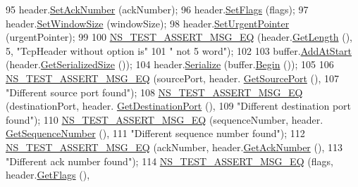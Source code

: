 \begin{DoxyCode}
95       header.\hyperlink{classns3_1_1TcpHeader_ad594a427a382dc395261a94749e1878c}{SetAckNumber} (ackNumber);
96       header.\hyperlink{classns3_1_1TcpHeader_a6574356013e9c62b4543486f640f6be6}{SetFlags} (flags);
97       header.\hyperlink{classns3_1_1TcpHeader_a659d7fc71c808249fe76fd5b667baf34}{SetWindowSize} (windowSize);
98       header.\hyperlink{classns3_1_1TcpHeader_a082b4d492dd7fb0b788a4c959f9065cc}{SetUrgentPointer} (urgentPointer);
99 
100       \hyperlink{group__testing_ga2a9d78cffb3db8e867c35fff0b698cf5}{NS\_TEST\_ASSERT\_MSG\_EQ} (header.\hyperlink{classns3_1_1TcpHeader_a957928d2dd1108dc1ef8c38daecdcf62}{GetLength} (), 5, \textcolor{stringliteral}{"TcpHeader without
       option is"}
101                              \textcolor{stringliteral}{" not 5 word"});
102 
103       buffer.\hyperlink{classns3_1_1Buffer_a8abd8164c3671d3dadc98fc66fade7b1}{AddAtStart} (header.\hyperlink{classns3_1_1TcpHeader_a1cbb8a10b7838d428f2e94806d3ce807}{GetSerializedSize} ());
104       header.\hyperlink{classns3_1_1TcpHeader_ab492a55e7e9a54ec4938035696877aa3}{Serialize} (buffer.\hyperlink{classns3_1_1Buffer_a893d4bf50df13e730b6cd0fda91b967f}{Begin} ());
105 
106       \hyperlink{group__testing_ga2a9d78cffb3db8e867c35fff0b698cf5}{NS\_TEST\_ASSERT\_MSG\_EQ} (sourcePort, header.
      \hyperlink{classns3_1_1TcpHeader_a3300d2c712ce38896520f12f185542cb}{GetSourcePort} (),
107                              \textcolor{stringliteral}{"Different source port found"});
108       \hyperlink{group__testing_ga2a9d78cffb3db8e867c35fff0b698cf5}{NS\_TEST\_ASSERT\_MSG\_EQ} (destinationPort, header.
      \hyperlink{classns3_1_1TcpHeader_ae974488dcfbd68c5b99a731d8fe63771}{GetDestinationPort} (),
109                              \textcolor{stringliteral}{"Different destination port found"});
110       \hyperlink{group__testing_ga2a9d78cffb3db8e867c35fff0b698cf5}{NS\_TEST\_ASSERT\_MSG\_EQ} (sequenceNumber, header.
      \hyperlink{classns3_1_1TcpHeader_a1081077eaf9bc64e9af909cebd128ae5}{GetSequenceNumber} (),
111                              \textcolor{stringliteral}{"Different sequence number found"});
112       \hyperlink{group__testing_ga2a9d78cffb3db8e867c35fff0b698cf5}{NS\_TEST\_ASSERT\_MSG\_EQ} (ackNumber, header.\hyperlink{classns3_1_1TcpHeader_a76e832a86b88ffd2f23c2e246b8fa0f3}{GetAckNumber} (),
113                              \textcolor{stringliteral}{"Different ack number found"});
114       \hyperlink{group__testing_ga2a9d78cffb3db8e867c35fff0b698cf5}{NS\_TEST\_ASSERT\_MSG\_EQ} (flags, header.\hyperlink{classns3_1_1TcpHeader_a0d04c5620ee147d4e01d56b9530e8db1}{GetFlags} (),

\end{DoxyCode}
